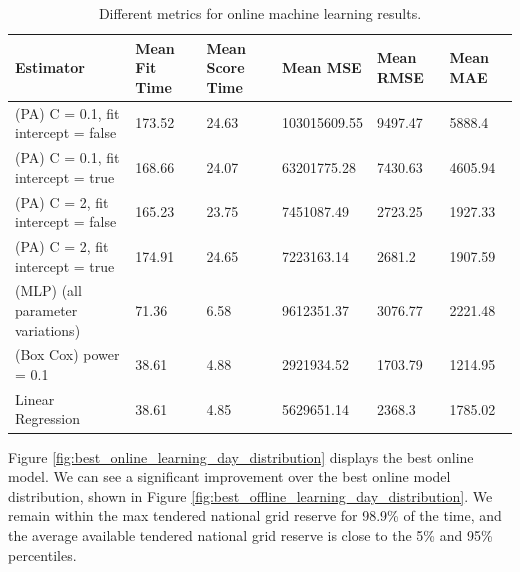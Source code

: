 \documentclass[final,3p,times,twocolumn,numbers]{elsarticle}
\begin{document}
\begin{table}[]
\centering
\footnotesize
\begin{tabular}{@{}llllll@{}}
\toprule
Estimator                                                                          & Mean Fit Time & Mean Score Time & Mean MSE     & Mean RMSE & Mean MAE \\ \midrule
(PA) C = 0.1, fit intercept = false & 173.52        & 24.63           & 103015609.55 & 9497.47   & 5888.4   \\
(PA) C = 0.1, fit intercept = true     & 168.66        & 24.07           & 63201775.28  & 7430.63   & 4605.94  \\
(PA) C = 2, fit intercept = false      & 165.23        & 23.75           & 7451087.49   & 2723.25   & 1927.33  \\
(PA) C = 2, fit intercept = true       & 174.91        & 24.65           & 7223163.14   & 2681.2    & 1907.59  \\
(MLP) (all parameter variations)                                                     & 71.36         & 6.58            & 9612351.37   & 3076.77   & 2221.48  \\
(Box Cox) power = 0.1                                                              & 38.61         & 4.88            & 2921934.52   & 1703.79   & 1214.95  \\
Linear Regression                                                                  & 38.61         & 4.85            & 5629651.14   & 2368.3    & 1785.02  \\ \bottomrule
\end{tabular}
	\caption{Different metrics for online machine learning results.}
	\label{table:online_ml_metrics}
\end{table}




Figure \ref{fig:best_online_learning_day_distribution} displays the best online model. We can see a significant improvement over the best online model distribution, shown in Figure \ref{fig:best_offline_learning_day_distribution}. We remain within the max tendered national grid reserve for 98.9\% of the time, and the average available tendered national grid reserve is close to the 5\% and 95\% percentiles.
\end{document}
